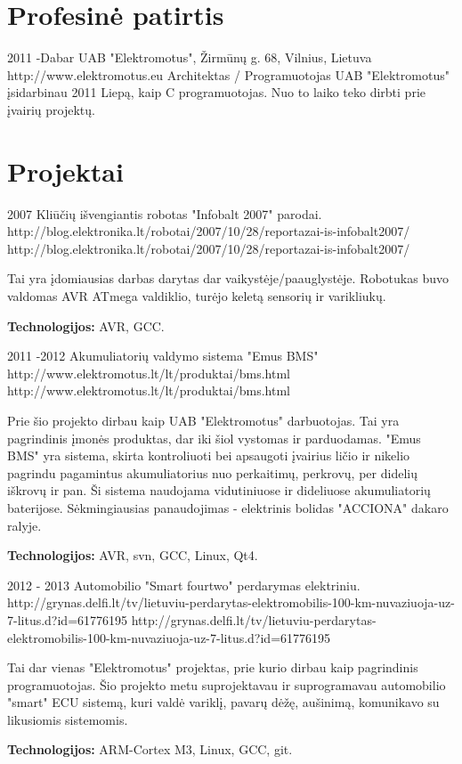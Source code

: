 \documentclass[12]{article}
\begin{document}

\section{Profesinė patirtis}

\job
{2011 -}{Dabar}
{UAB "Elektromotus", Žirmūnų g. 68, Vilnius, Lietuva}
{http://www.elektromotus.eu}
{Architektas / Programuotojas}
{
UAB "Elektromotus" įsidarbinau 2011 Liepą, kaip C programuotojas.
Nuo to laiko teko dirbti prie įvairių projektų.}


\section{Projektai}

\job
{2007}{}
{Kliūčių išvengiantis robotas "Infobalt 2007" parodai.}
{http://blog.elektronika.lt/robotai/2007/10/28/reportazai-is-infobalt2007/}
{http://blog.elektronika.lt/robotai/2007/10/28/reportazai-is-infobalt2007/}
{Tai yra įdomiausias darbas darytas dar vaikystėje/paauglystėje.
Robotukas buvo valdomas AVR ATmega valdiklio, turėjo keletą sensorių ir varikliukų.\\
\rule{0mm}{5mm}\textbf{Technologijos:} AVR, GCC.}


\job
{2011 -}{2012}
{Akumuliatorių valdymo sistema "Emus BMS"}
{http://www.elektromotus.lt/lt/produktai/bms.html}
{http://www.elektromotus.lt/lt/produktai/bms.html}
{Prie šio projekto dirbau kaip UAB "Elektromotus" darbuotojas. Tai yra pagrindinis įmonės produktas, dar iki šiol vystomas ir parduodamas.
"Emus BMS" yra sistema, skirta kontroliuoti bei apsaugoti įvairius ličio ir nikelio pagrindu pagamintus akumuliatorius nuo perkaitimų, perkrovų, per didelių iškrovų ir pan.
Ši sistema naudojama vidutiniuose ir dideliuose akumuliatorių baterijose.
Sėkmingiausias panaudojimas - elektrinis bolidas "ACCIONA" dakaro ralyje.\\
\rule{0mm}{5mm}\textbf{Technologijos:} AVR, svn, GCC, Linux, Qt4.}

\job
{2012 - }{2013}
{Automobilio "Smart fourtwo" perdarymas elektriniu.}
{http://grynas.delfi.lt/tv/lietuviu-perdarytas-elektromobilis-100-km-nuvaziuoja-uz-7-litus.d?id=61776195}
{http://grynas.delfi.lt/tv/lietuviu-perdarytas-elektromobilis-100-km-nuvaziuoja-uz-7-litus.d?id=61776195}
{Tai dar vienas "Elektromotus" projektas, prie kurio dirbau kaip pagrindinis programuotojas.
Šio projekto metu suprojektavau ir suprogramavau automobilio "smart" ECU sistemą, kuri valdė
variklį, pavarų dėžę, aušinimą, komunikavo su likusiomis sistemomis.\\
\rule{0mm}{5mm}\textbf{Technologijos:} ARM-Cortex M3, Linux, GCC, git.}
\end{document}
